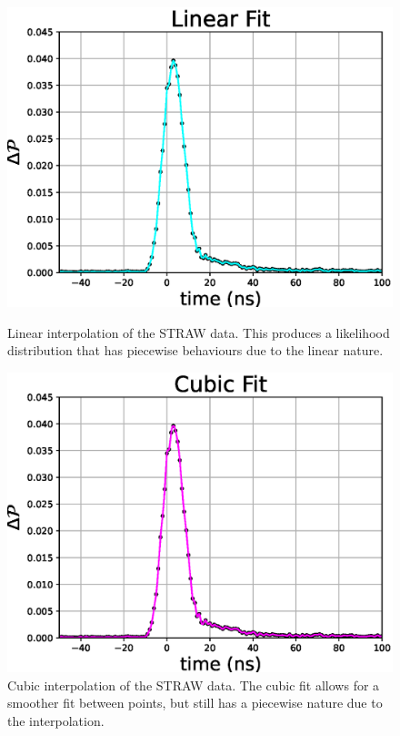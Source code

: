 \begin{figure}[H]
  \begin{minipage}[b]{0.48\linewidth}
    \centering
    \includegraphics[width=\textwidth]{./Figures/reco_plots/straw_data_fit_lnear.eps}
    \caption{Linear interpolation of the STRAW data. This produces a likelihood distribution that has piecewise behaviours due to the linear nature.}
    \label{subfig:straw_data_linear}
  \end{minipage}
  \hspace{0.1cm}
  \begin{minipage}[b]{0.48\linewidth}
    \centering
    \includegraphics[width=\textwidth]{./Figures/reco_plots/straw_data_fit_cubic.eps}
    \caption{Cubic interpolation of the STRAW data. The cubic fit allows for a smoother fit between points, but still has a piecewise nature due to the interpolation.}
    \label{subfig:straw_data_cubic}
  \end{minipage}
\end{figure}

